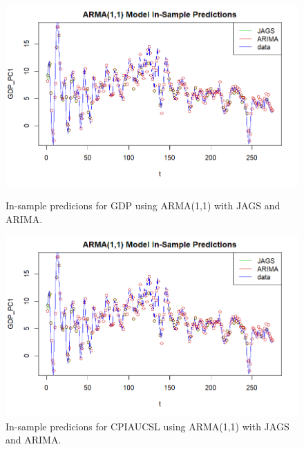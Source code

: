 \begin{figure}[H]
    \centering
    \begin{minipage}{0.49\textwidth}
        \centering
        \includegraphics[width=\textwidth]{images/4-ARMA/ARIMA_ARMA_predictions_gdp.png}
        \caption{In-sample predicions for GDP using ARMA(1,1) with JAGS and ARIMA.}
        \label{fig:ARIMA_ARMA_gdp_prediction}
    \end{minipage}\hfill
    \begin{minipage}{0.49\textwidth}
        \centering
        \includegraphics[width=\textwidth]{images/4-ARMA/ARIMA_ARMA_predictions_gdp.png}
        \caption{In-sample predicions for CPIAUCSL using ARMA(1,1) with JAGS and ARIMA.}
        \label{fig:ARIMA_ARMA_infl_prediction}
    \end{minipage}
\end{figure}

